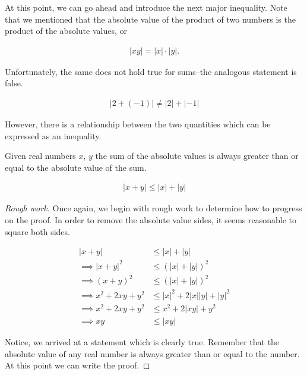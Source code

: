 \documentclass[twoside]{report}
\begin{document}
At this point, we can go ahead and introduce the next major inequality. Note that we mentioned that the absolute value of the product of two numbers is the product of the absolute values, or

\begin{align*}
	|xy| = |x| \cdot |y|.
\end{align*}

Unfortunately, the same does not hold true for sums--the analogous statement is false.

\begin{align*}
	|2 + (-1)| \neq |2| + |-1|
\end{align*}

However, there is a relationship between the two quantities which can be expressed as an inequality. \\

\begin{theorem}
	Given real numbers $x$, $y$ the sum of the absolute values is always greater than or equal to the absolute value of the sum.
	
	\begin{align}
		|x + y| \le |x| + |y|
	\end{align}
\end{theorem}

\begin{proof}[Rough work]\let\qed\relax
	Once again, we begin with rough work to determine how to progress on the proof. In order to remove the absolute value sides, it seems reasonable to square both sides.
	
	\begin{align*}
		|x + y| &\le |x| + |y| \\
		\implies |x + y|^2 &\le (|x| + |y|)^2 \\
		\implies (x + y)^2 &\le (|x| + |y|)^2 \\
		\implies x^2 + 2xy + y^2 &\le |x|^2 + 2|x||y| + |y|^2 \\
		\implies x^2 + 2xy + y^2 &\le x^2 + 2|xy| + y^2 \\
		\implies xy &\le |xy|
	\end{align*}
	
	Notice, we arrived at a statement which is clearly true. Remember that the absolute value of any real number is always greater than or equal to the number. At this point we can write the proof.
\end{proof}
\vspace{\baselineskip}
\end{document}
